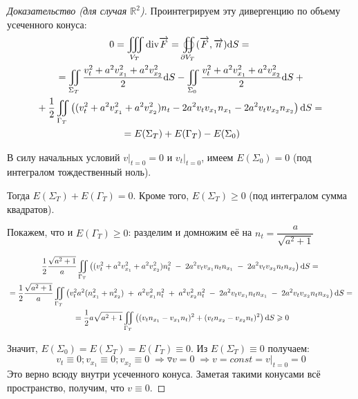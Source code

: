 \begin{proof}[Доказательство (для случая $\mathbb{R}^2$)]
Проинтегрируем эту дивергенцию по объему усеченного конуса:
\begin{multline*}
  0=\iiint\limits_{V_T}\mathrm{div}\overrightarrow{F} = \oiint\limits_{\partial V_T}(\overrightarrow{F},\overrightarrow{n})\mathrm{d}S = {}\\
  {} =\iint\limits_{\Sigma_T}\frac{v^2_t+a^2v^2_{x_1}+a^2v^2_{x_2}}{2}\mathrm{d}S-\iint\limits_{\Sigma_0}\frac{v^2_t+a^2v^2_{x_1}+a^2v^2_{x_2}}{2}\mathrm{d}S + {}\\
  {} +\frac{1}{2}\iint\limits_{\Gamma_T}\left((v^2_t+a^2v^2_{x_1}+a^2v^2_{x_2})n_t-2a^2v_{t}v_{x_1}n_{x_1} - 2a^2v_{t}v_{x_2}n_{x_2}\right)\mathrm{d}S = {}\\
  {} = E(\Sigma_T) + E(\Gamma_T) - E(\Sigma_0) 
\end{multline*}

В силу начальных условий $ v|_{t=0}=0 $ и $ v_t|_{t=0} $, имеем $ E(\Sigma_0)=0 $ (под интегралом тождественный ноль).

Тогда $ E(\Sigma_T)+E(\Gamma_T)=0 $. 
Кроме того, $ E(\Sigma_T)\geq 0 $ (под интегралом сумма квадратов).

Покажем, что и $ E(\Gamma_T)\geq 0 $: разделим и домножим её на $ n_t=\dfrac{a}{\sqrt{a^2+1}} $

\begin{multline*}
  \frac{1}{2}\frac{\sqrt{a^2+1}}{a}\iint\limits_{\Gamma_T}\left((v^2_t+a^2v^2_{x_1}+a^2v^2_{x_2})n^2_t \; - \; 2a^2v_{t}v_{x_1}n_tn_{x_1} \; - \; 2a^2v_{t}v_{x_2}n_tn_{x_2}\right)\mathrm{d}S = {}\\
  {} =\frac{1}{2}\frac{\sqrt{a^2+1}}{a}\iint\limits_{\Gamma_T}\left(v^2_ta^2(n^2_{x_1} + n^2_{x_2})\; + \; a^2v^2_{x_1}n^2_t \; + \; a^2v^2_{x_2}n^2_t\; - \; 2a^2v_{t}v_{x_1}n_tn_{x_1} \; - \; 2a^2v_{t}v_{x_2}n_tn_{x_2}\right)\mathrm{d}S = {}\\
  {} = \frac{1}{2}a\sqrt{a^2+1}\iint\limits_{\Gamma_T}\left((v_tn_{x_1} -v_{x_1}n_t)^2+(v_tn_{x_2}-v_{x_2}n_t)^2\right)\mathrm{d}S\geqslant 0  
\end{multline*}

Значит, $ E(\Sigma_0)=E(\Sigma_T)=E(\Gamma_T)\equiv 0.$
\; Из $ E(\Sigma_T)\equiv0 $ получаем: 
$$ v_t\equiv0; v_{x_1}\equiv0; v_{x_2}\equiv0 \; \Rightarrow \triangledown v  = 0 \; \Rightarrow v = const = v|_{t=0}=0 
$$
Это верно всюду внутри усеченного конуса.
Заметая такими конусами всё пространство, получим, что $ v \equiv 0 $.
\end{proof}
